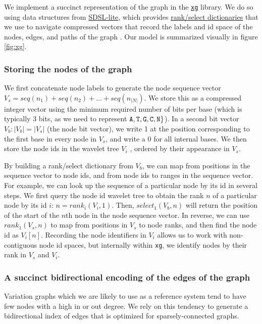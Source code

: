 \documentclass[12pt]{article}
\begin{document}
We implement a succinct representation of the graph in the \href{https://github.com/vgteam/xg}{{\tt xg}} library.
We do so using data structures from \href{https://github.com/simongog/sdsl-lite}{SDSL-lite}, which provides \href{https://en.wikipedia.org/wiki/Succinct_data_structure#Succinct_dictionaries}{rank/select dictionaries} that we use to navigate compressed vectors that record the labels and id space of the nodes, edges, and paths of the graph \cite{okanohara2007}.
Our model is summarized visually in figure \ref{fig:xg}.

\subsubsection{Storing the nodes of the graph}

We first concatenate node labels to generate the node sequence vector $V_s = seq(n_1) + seq(n_2) + \ldots + seq(n_{|N|})$.
We store this as a compressed integer vector using the minimum required number of bits per base (which is typically 3 bits, as we need to represent ${\tt A, T, G, C, N} \}$).
In a second bit vector $V_b : |V_b| = |V_s|$ (the node bit vector), we write 1 at the position corresponding to the first base in every node in $V_s$, and write a 0 for all internal bases.
We then store the node ids in the wavelet tree $V_i$ \cite{grossi2003high}, ordered by their appearance in $V_s$.

By building a rank/select dictionary from $V_b$, we can map from positions in the sequence vector to node ids, and from node ids to ranges in the sequence vector.
For example, we can look up the sequence of a particular node by its id in several steps.
We first query the node id wavelet tree to obtain the rank $n$ of a particular node by its id $i$: $n = rank_{i}(V_i, 1)$.
Then, $select_1(V_b, n)$ will return the position of the start of the $n$th node in the node sequence vector.
In reverse, we can use $rank_1(V_s, n)$ to map from positions in $V_s$ to node ranks, and then find the node id as $V_i[n]$.
Recording the node identifiers in $V_i$ allows us to work with non-contiguous node id spaces, but internally within {\tt xg}, we identify nodes by their rank in $V_s$ and $V_i$.

\subsubsection{A succinct bidirectional encoding of the edges of the graph}

Variation graphs which we are likely to use as a reference system tend to have few nodes with a high in or out degree.
We rely on this tendency to generate a bidirectional index of edges that is optimized for sparsely-connected graphs.
\end{document}
